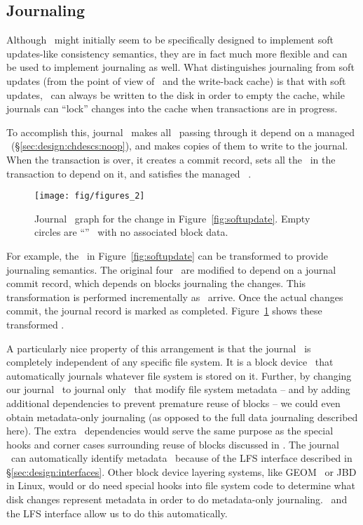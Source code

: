 \subsection{Journaling}
\label{sec:consistency:journal}


Although \chdescs\ might initially seem to be specifically designed to
implement soft updates-like consistency semantics, they are in fact much more
flexible and can be used to implement journaling as well. What distinguishes
journaling from soft updates (from the point of view of \chdescs\ and
the write-back cache) is that with soft updates, \chdescs\ can always
be written to the disk in order to empty the cache, while journals can
``lock'' changes into the cache when transactions are in progress.

To accomplish this, journal \module\ makes all \chdescs\ passing through it
depend on a managed \noop\ \chdesc (\S\ref{sec:design:chdescs:noop}), and makes
copies of them to write to the journal. When the transaction is over, it creates
a commit record, sets all the \chdescs\ in the transaction to depend on it, and
satisfies the managed \noop\ \chdesc.

\begin{figure}
  \centering
  \texttt{[image: fig/figures\_2]}
  \caption{\label{fig:journal} Journal \chdesc\ graph for the
    change in Figure~\ref{fig:softupdate}. Empty circles are
    ``\noop'' \chdescs\ with no associated block data.}
\end{figure}

For example, the \chdescs\ in Figure~\ref{fig:softupdate} can be transformed to
provide journaling semantics. The original four \chdescs\ are modified to depend
on a journal commit record, which depends on blocks journaling the changes. This
transformation is performed incrementally as \chdescs\ arrive. Once the actual
changes commit, the journal record is marked as completed.
Figure~\ref{fig:journal} shows these transformed \chdescs.

A particularly nice property of this arrangement is that the journal \module\ is
completely independent of any specific file system. It is a block device
\module\ that automatically journals whatever file system is stored on it.
Further, by changing our journal \module\ to journal only \chdescs\ that modify
file system metadata -- and by adding additional dependencies to prevent
premature reuse of blocks -- we could even obtain metadata-only journaling (as
opposed to the full data journaling described here). The extra \chdesc\
dependencies would serve the same purpose as the special hooks and corner cases
surrounding reuse of blocks discussed in \cite{tweedie00ext3}. The journal
\module\ can automatically identify metadata \chdescs\ because of the LFS
interface described in \S\ref{sec:design:interfaces}. Other block device
layering systems, like GEOM~\cite{geom} or JBD in Linux, would or do need
special hooks into file system code to determine what disk changes represent
metadata in order to do metadata-only journaling. \Chdescs\ and the LFS
interface allow us to do this automatically.
